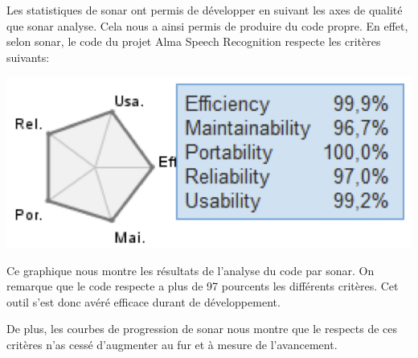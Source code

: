 Les statistiques de sonar ont permis de développer en suivant les axes de qualité que sonar analyse. Cela nous a ainsi permis de produire du code propre. En effet, selon sonar, le code du projet Alma Speech Recognition respecte les critères suivants: 

\includegraphics{img/sonar-axes.png} 

Ce graphique nous montre les résultats de l'analyse du code par sonar. On remarque que le code respecte a plus de 97 pourcents les différents critères. Cet outil s'est donc avéré efficace durant de développement.

De plus, les courbes de progression de sonar nous montre que le respects de ces critères n'as cessé d'augmenter au fur et à mesure de l'avancement.




